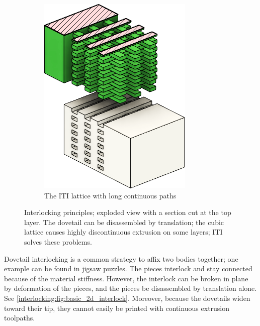 \begin{figure}
\begin{subfigure}[B]{.36\columnwidth}
		\includegraphics[height=\figheight]{sources-method-basic_lattice.png}
		\caption{The ITI lattice with long continuous paths}
		\label{interlocking:fig:basic_structure_single_mat}
	\end{subfigure}
	\caption{Interlocking principles; exploded view with a section cut at the top layer. The dovetail can be disassembled by translation; the cubic lattice causes highly discontinuous extrusion on some layers;  ITI solves these problems.}
	\label{interlocking:fig:basic_structure}
\end{figure}





Dovetail interlocking is a common strategy to affix two bodies together;
one example can be found in jigsaw puzzles.
The pieces interlock and stay connected because of the material stiffness.
However, the interlock can be broken in plane by deformation of the pieces,
and  the pieces  be disassembled by translation alone.
See \cref{interlocking:fig:basic_2d_interlock}.
Moreover, because the dovetails widen toward their tip, they cannot easily be printed with continuous extrusion toolpaths.

